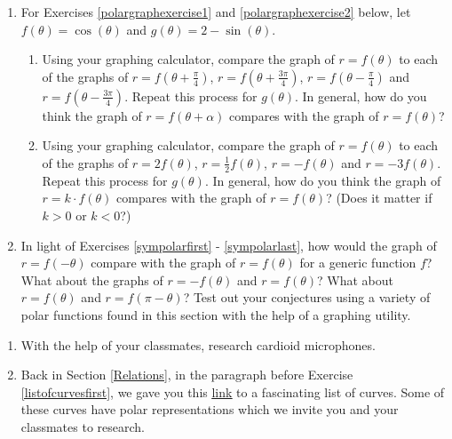 \begin{enumerate}

\setcounter{enumi}{\value{HW}}

\item  For Exercises \ref{polargraphexercise1} and \ref{polargraphexercise2} below, let  $f(\theta) = \cos(\theta)$ and $g(\theta) = 2-\sin(\theta)$. \label{polargraphtransformations}

\begin{enumerate}

\item  Using your graphing calculator, compare the graph of $r = f(\theta)$ to each of the graphs of $r = f\left(\theta  + \frac{\pi}{4}\right)$, $r = f\left(\theta  + \frac{3\pi}{4}\right)$, $r = f\left(\theta  - \frac{\pi}{4}\right)$ and $r = f\left(\theta  - \frac{3\pi}{4}\right)$.  Repeat this process for $g(\theta)$.  In general, how do you think the graph of $r = f(\theta + \alpha)$ compares with the graph of $r = f(\theta)$?
\label{polargraphexercise1}

\item  Using your graphing calculator, compare the graph of $r = f(\theta)$ to each of the graphs of $r = 2f\left(\theta\right)$, $r = \frac{1}{2} f\left(\theta\right)$, $r = -f\left(\theta\right)$ and $r = -3 f(\theta)$.  Repeat this process for $g(\theta)$.  In general, how do you think the graph of $r = k \cdot f(\theta)$ compares with the graph of $r = f(\theta)$? (Does it matter if $k>0$ or $k<0$?)
\label{polargraphexercise2}

\end{enumerate}

\item In light of Exercises \ref{sympolarfirst} - \ref{sympolarlast}, how would the graph of $r = f(-\theta)$ compare with the graph of $r = f(\theta)$ for a generic function $f$?  What about the graphs of $r = -f(\theta)$ and $r = f(\theta)$?  What about $r = f(\theta)$ and $r = f(\pi - \theta)$?  Test out your conjectures using a variety of polar functions found in this section with the help of a graphing utility.

\setcounter{HW}{\value{enumi}}

\end{enumerate}

\begin{enumerate}

\setcounter{enumi}{\value{HW}}

\item With the help of your classmates, research cardioid microphones.

\item Back in Section \ref{Relations}, in the paragraph before Exercise \ref{listofcurvesfirst}, we gave you this  \href{http://en.wikipedia.org/wiki/List_of_curves}{\underline{link}} to a fascinating list of curves.  Some of these curves have polar representations which we invite you and your classmates to research.

\setcounter{HW}{\value{enumi}}

\end{enumerate}

